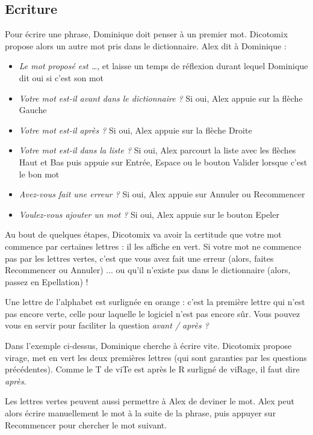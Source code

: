 \documentclass[french]{article}
\newcommand\image[2][.4]{\begin{center}\frame{\texttt{[image: images/\#2]}}\end{center}}
\begin{document}
\subsection{Ecriture}
Pour écrire une phrase, Dominique doit penser à un premier mot. Dicotomix propose alors un autre mot pris dans le dictionnaire. Alex dit à Dominique :
\begin{itemize}
	\item \emph{Le mot proposé est \dots}, et laisse un temps de réflexion durant lequel Dominique dit oui si c'est son mot
	\item \emph{Votre mot est-il avant dans le dictionnaire ?} Si oui, Alex appuie sur la flèche Gauche
	\item \emph{Votre mot est-il après ?} Si oui, Alex appuie sur la flèche Droite
	\item \emph{Votre mot est-il dans la liste ?} Si oui, Alex parcourt la liste avec les flèches Haut et Bas puis appuie sur Entrée, Espace ou le bouton Valider lorsque c'est le bon mot
	\item \emph{Avez-vous fait une erreur ?} Si oui, Alex appuie sur Annuler ou Recommencer
	\item \emph{Voulez-vous ajouter un mot ?} Si oui, Alex appuie sur le bouton Epeler
\end{itemize}

\image{boutons.png}

Au bout de quelques étapes, Dicotomix va avoir la certitude que votre mot commence par certaines lettres : il les affiche en vert. Si votre mot ne commence pas par les lettres vertes, c'est que vous avez fait une erreur (alors, faites Recommencer ou Annuler) ... ou qu'il n'existe pas dans le dictionnaire (alors, passez en Epellation) !

Une lettre de l'alphabet est surlignée en orange : c'est la première lettre qui n'est pas encore verte, celle pour laquelle le logiciel n'est pas encore sûr. Vous pouvez vous en servir pour faciliter la question \emph{avant / après ?}  

\image{prefix.png}

Dans l'exemple ci-dessus, Dominique cherche à écrire \og vite\fg{}. Dicotomix propose \og virage\fg{}, met en vert les deux premières lettres (qui sont garanties par les questions précédentes). Comme le T de \og viTe\fg{} est après le R surligné de \og viRage\fg{}, il faut dire \emph{après}.

Les lettres vertes peuvent aussi permettre à Alex de deviner le mot. Alex peut alors écrire manuellement le mot à la suite de la phrase, puis appuyer sur Recommencer pour chercher le mot suivant.
\end{document}
